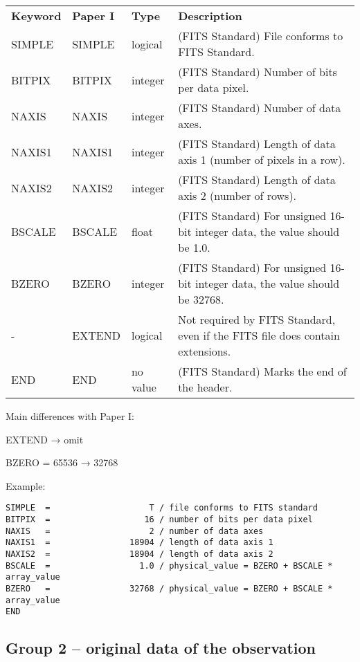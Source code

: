 \documentclass[11pt]{ivoa}
\begin{document}
\begin{inlinetable}
\footnotesize
\begin{tabular}{lllp{}}
\sptablerule
\textbf{Keyword}&\textbf{Paper I}&\textbf{Type}&\textbf{Description}\\
\sptablerule
SIMPLE     &SIMPLE     &logical     &(FITS Standard) File conforms to FITS
Standard.\\
BITPIX     &BITPIX     &integer     &(FITS Standard) Number of bits per data
pixel.\\
NAXIS     &NAXIS      &integer     &(FITS Standard) Number of data axes.\\
NAXIS1     &NAXIS1     &integer     &(FITS Standard) Length of data axis 1
(number of pixels in a row).\\
NAXIS2     &NAXIS2     &integer     &(FITS Standard) Length of data axis 2
(number of rows).\\
BSCALE     &BSCALE     &float             &(FITS Standard) For unsigned 16-bit
integer data, the value should be 1.0.\\
BZERO     &BZERO     &integer     &(FITS Standard) For unsigned 16-bit integer
data, the value should be 32768.\\
-     &EXTEND     &logical     &Not required by FITS Standard, even if the FITS
    file does contain extensions.\\
END     &END     &no value     &(FITS Standard) Marks the end of the
header.\\
\end{tabular}
\end{inlinetable}

Main differences with Paper I:

EXTEND → omit

BZERO = 65536 → 32768

Example:

\begin{lstlisting}
SIMPLE  =                    T / file conforms to FITS standard
BITPIX  =                   16 / number of bits per data pixel
NAXIS   =                    2 / number of data axes
NAXIS1  =                18904 / length of data axis 1
NAXIS2  =                18904 / length of data axis 2
BSCALE  =                  1.0 / physical_value = BZERO + BSCALE * array_value
BZERO   =                32768 / physical_value = BZERO + BSCALE * array_value
END
\end{lstlisting}


\subsection{Group 2 -- original data of the observation}
\end{document}
